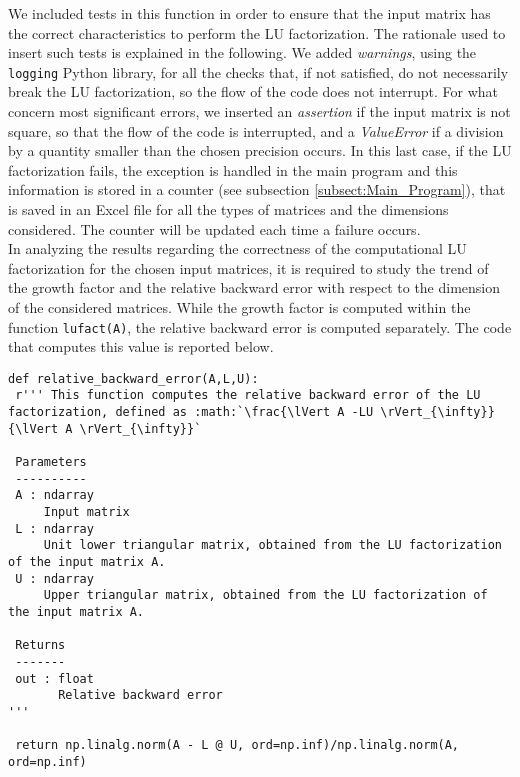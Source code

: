 \documentclass[a4paper,11pt]{report}
\begin{document}
\noindent We included tests in this function in order to ensure that the input matrix has the correct characteristics to perform the LU factorization. The rationale used to insert such tests is explained in the following. We added \textit{warnings}, using the \texttt{logging} Python library, for all the checks that, if not satisfied, do not necessarily break the LU factorization, so the flow of the code does not interrupt.
For what concern most significant errors, we inserted an \textit{assertion} if the input matrix is not square, so that the flow of the code is interrupted, and a \textit{ValueError} if a division by a quantity smaller than the chosen precision occurs. In this last case, if the LU factorization fails, the exception is handled in the main program and this information is stored in a counter (see subsection \ref{subsect:Main_Program}), that is saved in an Excel file for all the types of matrices and the dimensions considered. The counter will be updated each time a failure occurs.\\

\noindent In analyzing the results regarding the correctness of the computational LU factorization for the chosen input matrices, it is required to study the trend of the growth factor and the relative backward error with respect to the dimension of the considered matrices. While the growth factor is computed within the function \texttt{lufact(A)}, the relative backward error is computed separately. The code that computes this value is reported below.

\begin{verbatim}
def relative_backward_error(A,L,U):
 r''' This function computes the relative backward error of the LU factorization, defined as :math:`\frac{\lVert A -LU \rVert_{\infty}}{\lVert A \rVert_{\infty}}`

 Parameters
 ----------
 A : ndarray
     Input matrix
 L : ndarray
     Unit lower triangular matrix, obtained from the LU factorization of the input matrix A.
 U : ndarray
     Upper triangular matrix, obtained from the LU factorization of the input matrix A.

 Returns
 -------
 out : float
       Relative backward error
'''

 return np.linalg.norm(A - L @ U, ord=np.inf)/np.linalg.norm(A, ord=np.inf)
\end{verbatim}
\end{document}
